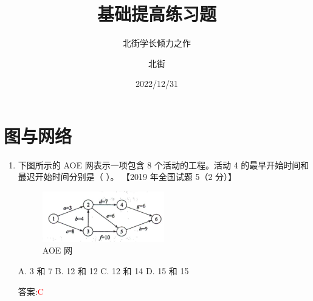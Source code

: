 \documentclass[lang=cn,newtx,10pt,scheme=chinese]{../../../elegantbook}
\title{基础提高练习题}
\subtitle{北街学长倾力之作}
\author{北街}
\date{2022/12/31}
\begin{document}
\maketitle
\frontmatter

\tableofcontents

\mainmatter


\chapter{图与网络}


\begin{enumerate}
    \item 下图所示的 AOE 网表示一项包含 8 个活动的工程。活动 4 的最早开始时间和最迟开始时间分别是（ ）。  
    【2019 年全国试题 5（2 分）】  
    \begin{figure}[h!]
            \centering
            \includegraphics[width=0.5\textwidth]{../../figure/exercisePicPDF/chapter7/7-1.pdf}
            \caption{AOE 网}
    \end{figure}

    A. 3 和 7 \quad B. 12 和 12 \quad C. 12 和 14 \quad D. 15 和 15  

    答案:\textcolor{red}{C}


\end{enumerate}
\end{document}
